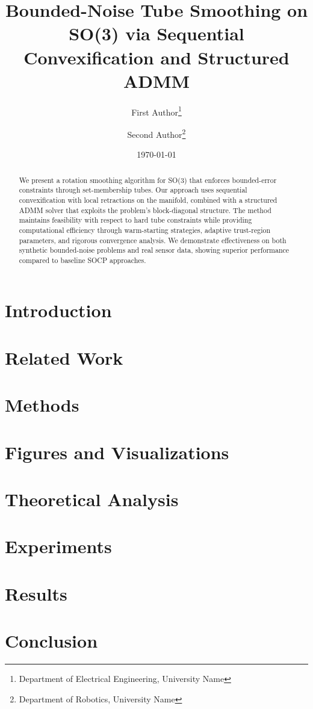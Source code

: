 \documentclass{article}
\title{Bounded-Noise Tube Smoothing on SO(3) via Sequential Convexification and Structured ADMM}
\author{First Author\thanks{Department of Electrical Engineering, University Name} \and Second Author\thanks{Department of Robotics, University Name}}
\date{\today}
\begin{document}
\maketitle

\begin{abstract}
We present a rotation smoothing algorithm for SO(3) that enforces bounded-error constraints through set-membership tubes. Our approach uses sequential convexification with local retractions on the manifold, combined with a structured ADMM solver that exploits the problem's block-diagonal structure. The method maintains feasibility with respect to hard tube constraints while providing computational efficiency through warm-starting strategies, adaptive trust-region parameters, and rigorous convergence analysis. We demonstrate effectiveness on both synthetic bounded-noise problems and real sensor data, showing superior performance compared to baseline SOCP approaches.

\end{abstract}

\section{Introduction}



\section{Related Work}



\section{Methods}



\section{Figures and Visualizations}



\section{Theoretical Analysis}



\section{Experiments}



\section{Results}



\section{Conclusion}





\end{document}
